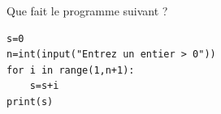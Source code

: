 \begin{exo}{}
	Que fait le programme suivant ?
	{\footnotesize
	\begin{lstlisting}
s=0
n=int(input("Entrez un entier > 0"))
for i in range(1,n+1):
    s=s+i
print(s)
\end{lstlisting}
	}
\end{exo}
